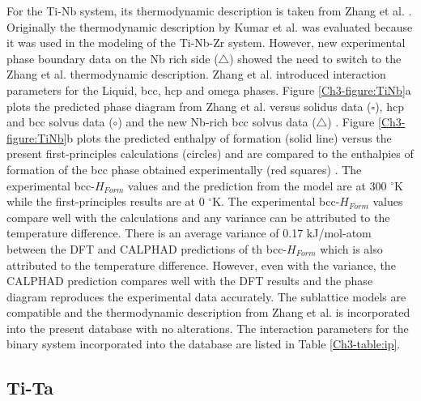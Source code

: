 For the Ti-Nb system, its thermodynamic description is taken from Zhang et al. \cite{Zhang2001}. Originally the thermodynamic description by Kumar et al. \cite{Kumar1994,Kumar1994a} was evaluated because it was used in the modeling of the Ti-Nb-Zr system. However, new experimental phase boundary data on the Nb rich side ($\bigtriangleup$) showed the need to switch to the Zhang et al. \cite{Zhang2001} thermodynamic description. Zhang et al. \cite{Zhang2001} introduced interaction parameters for the Liquid, bcc, hcp and omega phases. Figure \ref{Ch3-figure:TiNb}a plots the predicted phase diagram from Zhang et al. \cite{Zhang2001} versus solidus data ($\square$), hcp and bcc solvus data ($\circ$) \cite{Kumar1994,Kumar1994a} and the new Nb-rich bcc solvus data ($\bigtriangleup$) \cite{Zhang2001}. Figure \ref{Ch3-figure:TiNb}b plots the predicted enthalpy of formation (solid line) versus the present first-principles calculations (circles) and are compared to the enthalpies of formation of the bcc phase obtained experimentally (red squares) \cite{Uesugi2013}. The experimental bcc-$H_{Form}$ values and the prediction from the model are at 300 $^{\circ}$K while the first-principles results are at 0 $^{\circ}$K. The experimental bcc-$H_{Form}$ values compare well with the calculations and any variance can be attributed to the temperature difference. There is an average variance of 0.17 kJ/mol-atom between the DFT and CALPHAD predictions of th bcc-$H_{Form}$ which is also attributed to the temperature difference. However, even with the variance, the CALPHAD prediction compares well with the DFT results and the phase diagram reproduces the experimental data accurately. The sublattice models are compatible and the thermodynamic description from Zhang et al. \cite{Zhang2001} is incorporated into the present database with no alterations. The interaction parameters for the binary system incorporated into the database are listed in Table \ref{Ch3-table:ip}.

\subsection{Ti-Ta}

